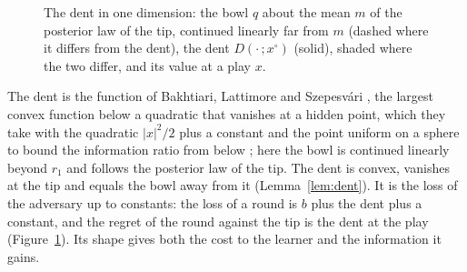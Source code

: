 \documentclass[11pt]{amsart}
\theoremstyle{definition}
\numberwithin{equation}{section}
\begin{document}
\begin{figure}[ht]
\centering
{}
\caption{The dent in one dimension: the bowl $q$ about the mean $m$ of the posterior law of the tip, continued linearly far from $m$ (dashed where it differs from the dent), the dent $D(\cdot\,;x^\circ)$ (solid), shaded where the two differ, and its value at a play $x$.}\label{fig:dent}
\end{figure}

The dent is the function of Bakhtiari, Lattimore and Szepesv\'ari \cite[Lemma~10]{BLS25}, the largest convex function below a quadratic that vanishes at a hidden point, which they take with the quadratic $|x|^2/2$ plus a constant and the point uniform on a sphere to bound the information ratio from below \cite[Theorem~12]{BLS25}; here the bowl is continued linearly beyond $r_1$ and follows the posterior law of the tip. The dent is convex, vanishes at the tip and equals the bowl away from it (Lemma~\ref{lem:dent}). It is the loss of the adversary up to constants: the loss of a round is $b$ plus the dent plus a constant, and the regret of the round against the tip is the dent at the play (Figure~\ref{fig:dent}). Its shape gives both the cost to the learner and the information it gains.
\end{document}
